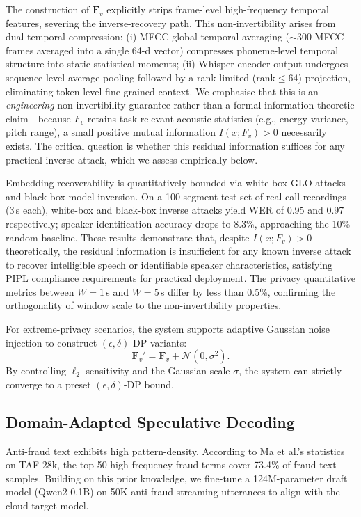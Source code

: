\documentclass[11pt, a4paper]{article}
\begin{document}
The construction of $\bm{F}_v$ explicitly strips frame-level high-frequency temporal features, severing the inverse-recovery path. This non-invertibility arises from dual temporal compression: (i) MFCC global temporal averaging ($\sim$300 MFCC frames averaged into a single 64-d vector) compresses phoneme-level temporal structure into static statistical moments; (ii) Whisper encoder output undergoes sequence-level average pooling followed by a rank-limited ($\text{rank}\le 64$) projection, eliminating token-level fine-grained context. We emphasise that this is an \emph{engineering} non-invertibility guarantee rather than a formal information-theoretic claim---because $F_v$ retains task-relevant acoustic statistics (e.g., energy variance, pitch range), a small positive mutual information $I(x;F_v)>0$ necessarily exists. The critical question is whether this residual information suffices for any practical inverse attack, which we assess empirically below.

Embedding recoverability is quantitatively bounded via white-box GLO attacks and black-box model inversion. On a 100-segment test set of real call recordings (3\,s each), white-box and black-box inverse attacks yield WER of 0.95 and 0.97 respectively; speaker-identification accuracy drops to 8.3\%, approaching the 10\% random baseline. These results demonstrate that, despite $I(x;F_v)>0$ theoretically, the residual information is insufficient for any known inverse attack to recover intelligible speech or identifiable speaker characteristics, satisfying PIPL compliance requirements for practical deployment. The privacy quantitative metrics between $W = 1$\,s and $W = 5$\,s differ by less than 0.5\%, confirming the orthogonality of window scale to the non-invertibility properties.

For extreme-privacy scenarios, the system supports adaptive Gaussian noise injection to construct $(\epsilon, \delta)$-DP variants:
\begin{equation}
\bm{F}_v' = \bm{F}_v + \mathcal{N}(0, \sigma^2).
\end{equation}
By controlling $\ell_2$ sensitivity and the Gaussian scale $\sigma$, the system can strictly converge to a preset $(\epsilon,\delta)$-DP bound.

\subsection{Domain-Adapted Speculative Decoding}

Anti-fraud text exhibits high pattern-density. According to Ma et al.'s statistics on TAF-28k, the top-50 high-frequency fraud terms cover 73.4\% of fraud-text samples. Building on this prior knowledge, we fine-tune a 124M-parameter draft model (Qwen2-0.1B) on 50K anti-fraud streaming utterances to align with the cloud target model.
\end{document}
